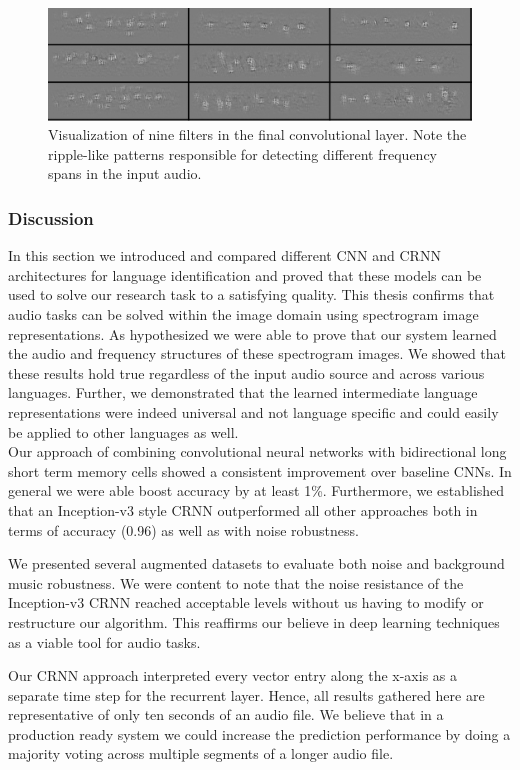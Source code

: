	\begin{figure}[h]
  		\centering
    	\includegraphics[width=\textwidth, keepaspectratio]{img/conv_filter.png}
    	\caption{Visualization of nine filters in the final convolutional layer. Note the ripple-like patterns responsible for detecting different frequency spans in the input audio.}
    	\label{fig:conv_filter}
	\end{figure}

\subsubsection{Discussion} 
\label{sec:comparison}
In this section we introduced and compared different CNN and CRNN architectures for language identification and proved that these models can be used to solve our research task to a satisfying quality. This thesis confirms that audio tasks can be solved within the image domain using spectrogram image representations. As hypothesized we were able to prove that our system learned the audio and frequency structures of these spectrogram images. We showed that these results hold true regardless of the input audio source and across various languages. Further, we  demonstrated that the learned intermediate language representations were indeed universal and not language specific and could easily be applied to other languages as well.\\
 Our approach of combining convolutional neural networks with bidirectional long short term memory cells showed a consistent improvement over baseline CNNs. In general we were able boost accuracy by at least 1\%. Furthermore, we established that an Inception-v3 style CRNN outperformed all other approaches both in terms of accuracy (0.96) as well as with noise robustness. 

We presented several augmented datasets to evaluate both noise and background music robustness. We were content to note that the noise resistance of the Inception-v3 CRNN reached acceptable levels without us having to modify or restructure our algorithm. This reaffirms our believe in deep learning techniques as a viable tool for audio tasks.

Our CRNN approach interpreted every vector entry along the x-axis as a separate time step for the recurrent layer. Hence, all results gathered here are representative of only ten seconds of an audio file. We believe that in a production ready system we could increase the prediction performance by doing a majority voting across multiple segments of a longer audio file.

